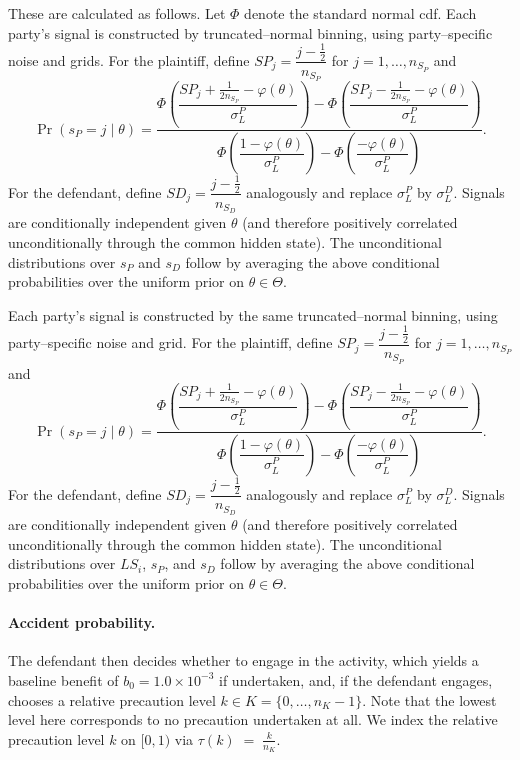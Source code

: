 \documentclass{article}
\begin{document}
These are calculated as follows. Let $\Phi$ denote the standard normal cdf. Each party’s signal is constructed by truncated–normal binning, using party–specific noise and grids. For the plaintiff, define $SP_j=\dfrac{j-\tfrac12}{n_{S_P}}$ for $j=1,\dots,n_{S_P}$ and
\[
\Pr(s_P=j\mid \theta)
=
\frac{
\Phi\!\left(\dfrac{SP_j+\tfrac{1}{2n_{S_P}}-\varphi(\theta)}{\sigma_L^{P}}\right)
-
\Phi\!\left(\dfrac{SP_j-\tfrac{1}{2n_{S_P}}-\varphi(\theta)}{\sigma_L^{P}}\right)
}{
\Phi\!\left(\dfrac{1-\varphi(\theta)}{\sigma_L^{P}}\right)
-
\Phi\!\left(\dfrac{-\varphi(\theta)}{\sigma_L^{P}}\right)
}.
\]
For the defendant, define $SD_j=\dfrac{j-\tfrac12}{n_{S_D}}$ analogously and replace $\sigma_L^{P}$ by $\sigma_L^{D}$. Signals are conditionally independent given $\theta$ (and therefore positively correlated unconditionally through the common hidden state). The unconditional distributions over $s_P$ and $s_D$ follow by averaging the above conditional probabilities over the uniform prior on $\theta\in\Theta$.


Each party’s signal is constructed by the same truncated–normal binning, using party–specific noise and grid. For the plaintiff, define $SP_j=\dfrac{j-\tfrac12}{n_{S_P}}$ for $j=1,\dots,n_{S_P}$ and
\[
\Pr(s_P=j\mid \theta)
=
\frac{
\Phi\!\left(\dfrac{SP_j+\tfrac{1}{2n_{S_P}}-\varphi(\theta)}{\sigma_L^{P}}\right)
-
\Phi\!\left(\dfrac{SP_j-\tfrac{1}{2n_{S_P}}-\varphi(\theta)}{\sigma_L^{P}}\right)
}{
\Phi\!\left(\dfrac{1-\varphi(\theta)}{\sigma_L^{P}}\right)
-
\Phi\!\left(\dfrac{-\varphi(\theta)}{\sigma_L^{P}}\right)
}.
\]
For the defendant, define $SD_j=\dfrac{j-\tfrac12}{n_{S_D}}$ analogously and replace $\sigma_L^{P}$ by $\sigma_L^{D}$. Signals are conditionally independent given $\theta$ (and therefore positively correlated unconditionally through the common hidden state). The unconditional distributions over $LS_i$, $s_P$, and $s_D$ follow by averaging the above conditional probabilities over the uniform prior on $\theta\in\Theta$.

\paragraph{Accident probability.}

The defendant then decides whether to engage in the activity, which yields a baseline benefit of $b_0 = 1.0 \times 10^{-3}$ if undertaken, and, if the defendant engages, chooses a relative precaution level $k \in K = \{0,\dots,n_K-1\}$. Note that the lowest level here corresponds to no precaution undertaken at all. We index the relative precaution level $k$ on $[0,1)$ via $\tau(k) \;=\; \frac{k}{n_K }$.
\end{document}
